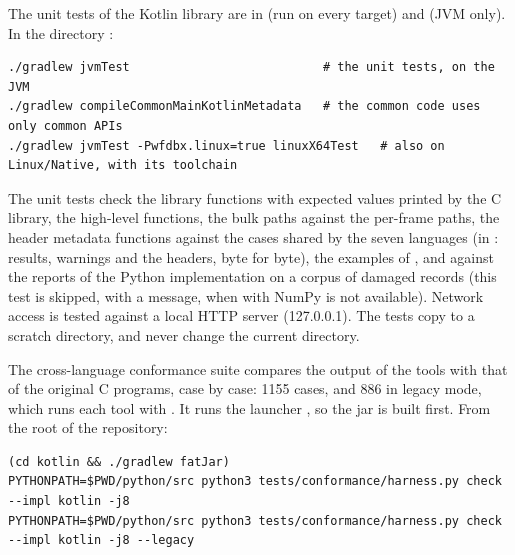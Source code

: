 The unit tests of the Kotlin library are in  (run on every
target) and  (JVM only). In the directory :

\begin{lstlisting}[style=shell]
./gradlew jvmTest                           # the unit tests, on the JVM
./gradlew compileCommonMainKotlinMetadata   # the common code uses only common APIs
./gradlew jvmTest -Pwfdbx.linux=true linuxX64Test   # also on Linux/Native, with its toolchain
\end{lstlisting}

The unit tests check the library functions with expected values printed by the C
library, the high-level functions, the bulk paths against the per-frame paths, the header
metadata functions against the cases shared by the seven languages (in
: results, warnings and the headers, byte for byte), the examples of
, and  against the reports of the Python
implementation on a corpus of damaged records (this test is skipped, with a message, when
 with NumPy is not available). Network access is tested against a local
HTTP server (127.0.0.1). The tests copy  to a scratch directory, and
never change the current directory.

The cross-language conformance suite compares the output of the tools with that of the
original C programs, case by case: 1155 cases, and 886 in legacy mode, which runs each
tool with . It runs the launcher , so the jar is
built first. From the root of the repository:

\begin{lstlisting}[style=shell]
(cd kotlin && ./gradlew fatJar)
PYTHONPATH=$PWD/python/src python3 tests/conformance/harness.py check --impl kotlin -j8
PYTHONPATH=$PWD/python/src python3 tests/conformance/harness.py check --impl kotlin -j8 --legacy
\end{lstlisting}
